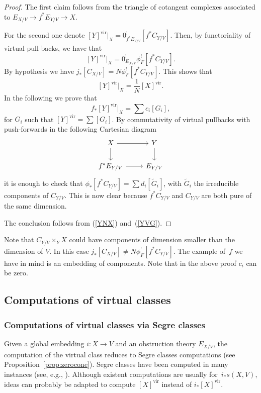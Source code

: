 \documentclass[pdftex]{sigma}
\numberwithin{equation}{section}
\newcommand{\vv}{\mathrm{vir}}
\theoremstyle{plain}
\theoremstyle{definition}
\theoremstyle{remark}
\begin{document}
\begin{proof} The first claim follows from the triangle of cotangent complexes associated to $E_{X/V}\to f^*E_{Y/V}\to X$.

For the second one denote $[Y]^{\vv}|_ X=0_{f^*E_{Y/V}}^![f^*C_{Y/V}]$. Then, by functoriality of virtual pull-backs, we have that
\[[Y]^{\vv}|_ X=0^!_{E_{X/V}}\phi_F^![f^*C_{Y/V}].
\]
By hypothesis we have $j_*[C_{X/V}]=N\phi_F^![f^*C_{Y/V}]$. This shows that
\begin{equation}\label{YNX}[Y]^{\vv}|_ X=\frac{1}{N}[X]^{\vv}.
\end{equation} In the following we prove that
\begin{equation}\label{YVG}f_*[Y]^{\vv}|_ X=\sum c_i[G_i],
\end{equation} for $G_i$ such that $[Y]^\vv=\sum [G_i]$. By commutativity of virtual pullbacks with push-forwards in the following Cartesian diagram
\[
\begin{tikzcd}
X\ar[r]\ar[d] & Y\ar[d] \\ f^*E_{Y/V}\ar[r] & E_{Y/V}
\end{tikzcd}
\]
it is enough to check that $\phi_*[f^*C_{Y/V}]=\sum d_i [\tilde G_i]$, with $\tilde G_i$ the irreducible components of $C_{Y/V}$. This is now clear because $f^*C_{Y/V}$ and $C_{Y/V}$ are both pure of the same dimension.

The conclusion follows from (\ref{YNX}) and~(\ref{YVG}).
\end{proof}

\begin{Remark} Note that $C_{Y/V}\times_Y X$ could have components of dimension smaller than the dimension of $V$. In this case $j_*[C_{X/V}]\neq N\phi_F^![f^*C_{Y/V}]$. The example of~$f$ we have in mind is an embedding of components. Note that in the above proof $c_i$ can be zero.
\end{Remark}

\subsection{Computations of virtual classes} \label{algorithms}
\subsubsection{Computations of virtual classes via Segre classes}
Given a global embedding $i\colon X\to V$ and an obstruction theory $E_{X/V}$, the computation of the virtual class reduces to Segre classes computations (see Proposition~\ref{prop:zerocone}). Segre classes have been computed in many instances (see, e.g., \cite{A1,A, AB,EJP,Helmer, Helmer2, MQ}). Although existent computations are usually for~$i_*s(X,V)$, ideas can probably be adapted
to compute $[X]^{\vv}$ instead of $i_*[X]^{\vv}$.
\end{document}
